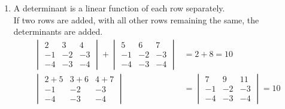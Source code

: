 \documentclass[../main.tex]{subfiles}
\begin{document}
\begin{example} \label{ex:4_10}
  \leavevmode
  \begin{enumerate}
    \item A determinant is a linear function of each row separately.\\
    If two rows are added, with all other rows remaining the same, the determinants are added.
    \begin{equation*}
      \begin{aligned}
        \begin{vmatrix}
          2 & 3 & 4\\
          -1 & -2 & -3\\
          -4 & -3 & -4
        \end{vmatrix}
        +\begin{vmatrix}
          5 & 6 & 7\\
          -1 & -2 & -3\\
          -4 & -3 & -4
        \end{vmatrix}
        &=2+8=10\\
        \begin{vmatrix}
          2+5 & 3+6 & 4+7\\
          -1 & -2 & -3\\
          -4 & -3 & -4
        \end{vmatrix}
        &=\begin{vmatrix}
          7 & 9 & 11\\
          -1 & -2 & -3\\
          -4 & -3 & -4
        \end{vmatrix}
        =10
      \end{aligned}
    \end{equation*}
    

\end{enumerate}
\end{example}
\end{document}
